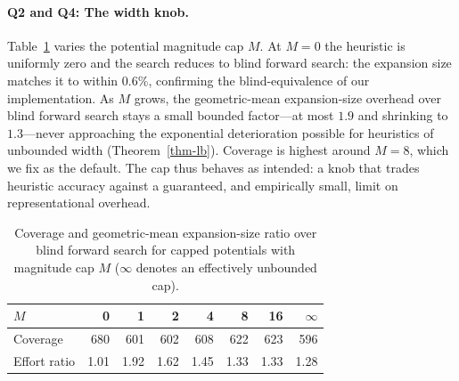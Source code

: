 \documentclass[letterpaper]{article}
\theoremstyle{plain}
\theoremstyle{definition}
\theoremstyle{remark}
\begin{document}
\paragraph{Q2 and Q4: The width knob.}
Table~\ref{tab-knob} varies the potential magnitude cap $M$. At $M = 0$
the heuristic is uniformly zero and the search reduces to blind forward
search: the expansion size matches it to within $0.6\%$, confirming the
blind-equivalence of our implementation. As $M$ grows, the geometric-mean
expansion-size overhead over blind forward search stays a small bounded
factor---at most $1.9$ and shrinking to $1.3$---never approaching the
exponential deterioration possible for heuristics of unbounded width
(Theorem~\ref{thm-lb}). Coverage is highest around $M = 8$, which we fix
as the default. The cap thus behaves as intended: a knob that trades
heuristic accuracy against a guaranteed, and empirically small, limit on
representational overhead.

\begin{table}[t]
\centering
\begin{tabular}{lrrrrrrr}
\toprule
$M$ & 0 & 1 & 2 & 4 & 8 & 16 & $\infty$ \\
\midrule
Coverage & 680 & 601 & 602 & 608 & 622 & 623 & 596 \\
Effort ratio & 1.01 & 1.92 & 1.62 & 1.45 & 1.33 & 1.33 & 1.28 \\
\bottomrule
\end{tabular}
\caption{Coverage and geometric-mean expansion-size ratio over blind
forward search for capped potentials with magnitude cap $M$
($\infty$ denotes an effectively unbounded cap).}
\label{tab-knob}
\end{table}
\end{document}
